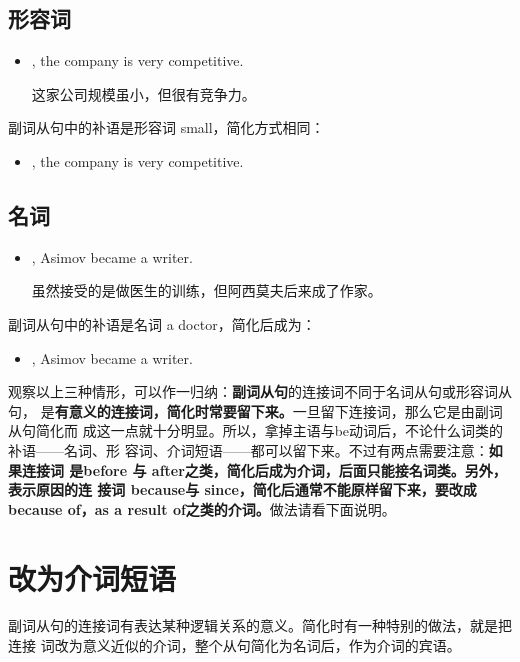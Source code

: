 \subsection{形容词}

\begin{itemize}
\item {}, the company is very competitive.

  这家公司规模虽小，但很有竞争力。
\end{itemize}
副词从句中的补语是形容词 small，简化方式相同：
\begin{itemize}
\item {}, the company is very competitive.
\end{itemize}

\subsection{名词}

\begin{itemize}
\item {}, Asimov became a writer.

  虽然接受的是做医生的训练，但阿西莫夫后来成了作家。
\end{itemize}
副词从句中的补语是名词 a doctor，简化后成为：
\begin{itemize}
\item {}, Asimov became a writer.
\end{itemize}
观察以上三种情形，可以作一归纳：\textbf{副词从句}的连接词不同于名词从句或形容词从句，
是\textbf{有意义的连接词，简化时常要留下来。}一旦留下连接词，那么它是由副词从句简化而
成这一点就十分明显。所以，拿掉主语与be动词后，不论什么词类的补语——名词、形
容词、介词短语——都可以留下来。不过有两点需要注意：\textbf{如果连接词
是before 与 after之类，简化后成为介词，后面只能接名词类。另外，表示原因的连
接词 because与 since，简化后通常不能原样留下来，要改成 because of，as a
result of之类的介词。}做法请看下面说明。

\section{改为介词短语}

副词从句的连接词有表达某种逻辑关系的意义。简化时有一种特别的做法，就是把连接
词改为意义近似的介词，整个从句简化为名词后，作为介词的宾语。

